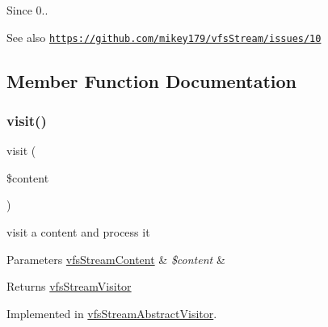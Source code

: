\begin{DoxySince}{Since}
0.. 
\end{DoxySince}
\begin{DoxySeeAlso}{See also}
\href{https://github.com/mikey179/vfsStream/issues/10}{\tt https\+://github.\+com/mikey179/vfs\+Stream/issues/10} 
\end{DoxySeeAlso}


\subsection{Member Function Documentation}
\mbox{\label{interfaceorg_1_1bovigo_1_1vfs_1_1visitor_1_1vfs_stream_visitor_ad262024718e58f64d782ed2a392b0702}} 
\subsubsection{\texorpdfstring{visit()}{visit()}}
{\footnotesize\ttfamily visit (\begin{DoxyParamCaption}\item[{\mbox{\hyperlink{interfaceorg_1_1bovigo_1_1vfs_1_1vfs_stream_content}{vfs\+Stream\+Content}}}]{\$content }\end{DoxyParamCaption})}

visit a content and process it


\begin{DoxyParams}[1]{Parameters}
\mbox{\hyperlink{interfaceorg_1_1bovigo_1_1vfs_1_1vfs_stream_content}{vfs\+Stream\+Content}} & {\em \$content} & \\
\hline
\end{DoxyParams}
\begin{DoxyReturn}{Returns}
\mbox{\hyperlink{interfaceorg_1_1bovigo_1_1vfs_1_1visitor_1_1vfs_stream_visitor}{vfs\+Stream\+Visitor}} 
\end{DoxyReturn}


Implemented in \mbox{\hyperlink{classorg_1_1bovigo_1_1vfs_1_1visitor_1_1vfs_stream_abstract_visitor_ad262024718e58f64d782ed2a392b0702}{vfs\+Stream\+Abstract\+Visitor}}.

\mbox{\label{interfaceorg_1_1bovigo_1_1vfs_1_1visitor_1_1vfs_stream_visitor_a58aba2b3abdff052e38254bba19aac72}} 
